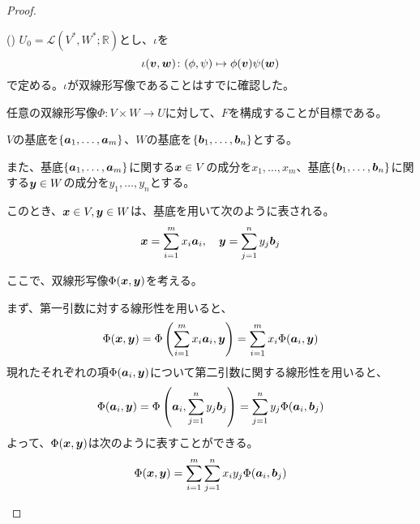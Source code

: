\documentclass[../../../topic_linear-algebra]{subfiles}
\begin{document}
\begin{proof}
  \begin{subpattern}{()}
    $U_0 = \mathcal{L}(V^*, W^*; \mathbb{R})$とし、$\iota$を
    \begin{equation*}
      \iota(\vb*{v}, \vb*{w}) \colon (\phi, \psi) \mapsto \phi(\vb*{v}) \psi(\vb*{w})
    \end{equation*}
    で定める。$\iota$が双線形写像であることはすでに確認した。
    
    \br
    
    任意の双線形写像$\Phi\colon V \times W \to U$に対して、$F$を構成することが目標である。
    
    \br
    
    $V$の基底を$\{\vb*{a}_1, \ldots, \vb*{a}_m\}$、$W$の基底を$\{\vb*{b}_1, \ldots, \vb*{b}_n\}$とする。
    
    また、基底$\{\vb*{a}_1, \ldots, \vb*{a}_m\}$に関する$\vb*{x} \in V$の成分を$x_1, \ldots, x_m$、基底$\{\vb*{b}_1, \ldots, \vb*{b}_n\}$に関する$\vb*{y} \in W$の成分を$y_1, \ldots, y_n$とする。
    
    このとき、$\vb*{x} \in V, \vb*{y} \in W$は、基底を用いて次のように表される。
    \begin{equation*}
      \vb*{x} = \sum_{i=1}^m x_i \vb*{a}_i, \quad \vb*{y} = \sum_{j=1}^n y_j \vb*{b}_j
    \end{equation*}
    
    \br
    
    ここで、双線形写像$\Phi(\vb*{x}, \vb*{y})$を考える。
    
    まず、第一引数に対する線形性を用いると、
    \begin{equation*}
      \Phi(\vb*{x}, \vb*{y}) = \Phi\left(\sum_{i=1}^m x_i \vb*{a}_i, \vb*{y}\right) = \sum_{i=1}^m x_i \Phi(\vb*{a}_i, \vb*{y})
    \end{equation*}
    現れたそれぞれの項$\Phi(\vb*{a}_i, \vb*{y})$について第二引数に関する線形性を用いると、
    \begin{equation*}
      \Phi(\vb*{a}_i, \vb*{y}) = \Phi\left(\vb*{a}_i, \sum_{j=1}^n y_j \vb*{b}_j\right) = \sum_{j=1}^n y_j \Phi(\vb*{a}_i, \vb*{b}_j)
    \end{equation*}
    よって、$\Phi(\vb*{x}, \vb*{y})$は次のように表すことができる。
    \begin{equation*}
      \Phi(\vb*{x}, \vb*{y}) = \sum_{i=1}^m \sum_{j=1}^n x_i y_j \Phi(\vb*{a}_i, \vb*{b}_j)
    \end{equation*}
    
    \br
    

\end{subpattern}
\end{proof}
\end{document}
